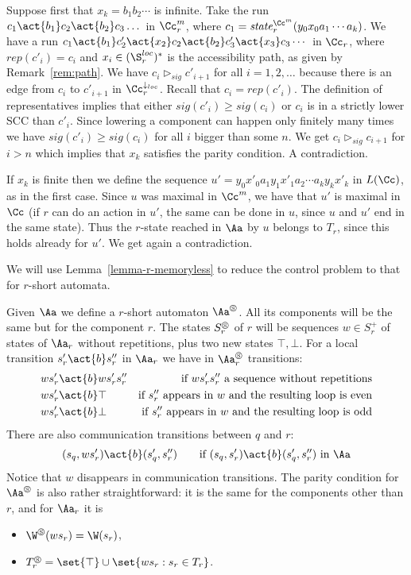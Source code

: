 \documentclass[10pt,a4paper]{article}
\newcommand{\sgt}{\vartriangleright_\sig}
\newcommand{\Ccloc}{\Cc^{\dar_{loc}}}
\newcommand{\sig}{\mathit{sig}}
\newcommand{\rep}{\mathit{rep}}
\newcommand{\short}[1]{#1^\circledS}
\newcommand{\mem}[1]{#1^m}
\newcommand{\Sloc}{\S^{loc}}
\newcommand{\state}{\mathit{state}}
\newcommand{\dar}{\downarrow}
\begin{document}
  Suppose first that $x_k=b_1b_2\cdots$ is infinite. Take the run
  $c_1\act{b_1} c_2\act{b_2} c_3\dots$ in $\mem\Cc_r$, where $c_1=\state_r^{\mem\Cc}(y_0x_0a_1\cdots a_k)$. We have a run
  $c_1\act{b_1} c'_2\act{x_2} c_2\act{b_2} c'_3\act{x_3} c_3 \cdots$ in
  $\Cc_r$, where $\rep(c'_i)=c_i$ and $x_i \in (\Sloc_r)^*$ is the accessibility path,
  as given by Remark~\ref{rem:path}. We have $c_i\sgt c'_{i+1}$ for all
  $i=1,2,\dots$ because there is an edge from $c_i$ to $c'_{i+1}$ in
  $\Ccloc_r$. Recall that $c_i=\rep(c'_i)$. The definition of
  representatives implies that either $\sig(c'_i)\geq \sig(c_i)$ or
  $c_i$ is in a strictly lower SCC than $c'_i$. Since lowering a
  component can happen only finitely many times we have
  $\sig(c'_i)\geq \sig(c_i)$ for all $i$ bigger than some $n$. We get
  $c_i\sgt c_{i+1}$ for $i>n$ which implies that $x_k$ satisfies the
  parity condition. A contradiction. 

If $x_k$ is finite then we define the sequence $u'=y_0x'_0a_1y_1x'_1a_2\cdots
a_ky_kx'_k$ in $L(\Cc)$, as in the first case. Since $u$ was maximal in $\mem\Cc$,
we have that $u'$ is maximal in $\Cc$ (if $r$ can do an action in
$u'$, the same can be done in $u$, since $u$ and $u'$ end in the same
state). Thus the $r$-state reached in $\Aa$ by $u$  belongs to $T_r$,
since this holds already for $u'$. We get again a contradiction.
\medskip

We will use Lemma~\ref{lemma-r-memoryless} to reduce the control
problem to that for $r$-short automata.

Given $\Aa$ we define a $r$-short automaton $\short\Aa$. All its
components will be the same but for the component $r$. The states $\short S_r$ of
$r$ will be sequences $w\in S^+_r$ of states of $\Aa_r$ without
repetitions, plus two new states $\top,\bot$. For a local transition
$s'_r\act{b} s''_r$ in $\Aa_r$ we have in $\short\Aa_r$ 
transitions:
\begin{align*}
  ws'_r\act{b}& ws'_rs''_r &\text{if $ws'_rs''_r$ a sequence without
    repetitions}\\
    ws'_r\act{b}& \top &\text{if $s''_r$ appears in $w$ and the
      resulting loop is even}\\
    ws'_r\act{b}& \bot &\text{if $s''_r$ appears in $w$ and the
      resulting loop is odd}
\end{align*}
There are also
communication transitions between $q$ and $r$:
\begin{equation*}
  (s_q,ws'_r)\act{b}(s'_q,s''_r)\qquad\text{if
    $(s_q,s'_r)\act{b}(s'_q,s''_r)$ in $\Aa$}
\end{equation*}
Notice that $w$ disappears in communication transitions. 
The  parity condition for $\short\Aa$ is also rather straightforward: it
is the same for the components other than $r$, and for $\Aa_r$ it is
\begin{itemize}
\item $\short\W(ws_r)=\W(s_r)$,
\item  $\short T_r=\set{\top}\cup\set{ws_r : s_r\in T_r}$.
\end{itemize}
\end{document}
